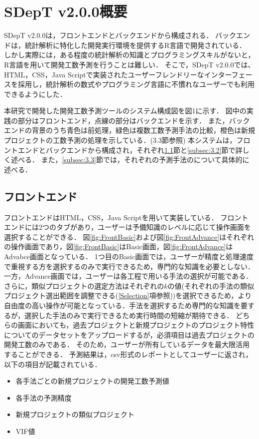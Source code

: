 \section{SDepT v2.0.0概要}\label{sec:3}

SDepT v2.0.0は，フロントエンドとバックエンドから構成される．
バックエンドは，統計解析に特化した開発実行環境を提供するR言語で開発されている．
しかし実際には，ある程度の統計解析の知識とプログラミングスキルがないと，R言語を用いて開発工数予測を行うことは難しい．
そこで，SDepT v2.0.0では、HTML，CSS，Java Scriptで実装されたユーザーフレンドリーなインターフェースを採用し，統計解析の数式やプログラミング言語に不慣れなユーザーでも利用できるようにした．

本研究で開発した開発工数予測ツールのシステム構成図を図1に示す．
図中の実践の部分はフロントエンド，点線の部分はバックエンドを示す．
また，バックエンドの背景のうち青色は前処理，緑色は複数工数予測手法の比較，橙色は新規プロジェクトの工数予測の処理を示している．(3.3節参照)
本システムは，フロントエンドとバックエンドから構成され，それぞれ\ref{subsec:3.1}節と\ref{subsec:3.2}節で詳しく述べる．
また，\ref{subsec:3.3}節では，それぞれの予測手法のについて具体的に述べる．


\clearpage
\subsection{フロントエンド}\label{subsec:3.1}
フロントエンドはHTML，CSS，Java Scriptを用いて実装している．
フロントエンドには2つのタブがあり，ユーザーは予備知識のレベルに応じて操作画面を選択することができる．
図\ref{fig:FrontBasic}および図\ref{fig:FrontAdvance}はそれぞれの操作画面であり，図\ref{fig:FrontBasic}はBasic画面，図\ref{fig:FrontAdvance}はAdvabce画面となっている．
1つ目のBasic画面では，ユーザーが精度と処理速度で重視する方を選択するのみで実行できるため，専門的な知識を必要としない．
一方，Advance画面では，ユーザーは各工程で用いる手法の選択が可能である．
さらに，類似プロジェクトの選定方法はそれぞれの$k$の値(それぞれの手法の類似プロジェクト選出範囲を調整できる(\ref{Selection}項参照))を選択できるため，より自由度の高い操作が可能となっている．手法を選択するため専門的な知識を要するが，選択した手法のみで実行できるため実行時間の短縮が期待できる．
どちらの画面においても，過去プロジェクトと新規プロジェクトのプロジェクト特性についてのデータセットをアップロードするが，必須項目は過去プロジェクトの開発工数のみである．
そのため，ユーザーが所有しているデータを最大限活用することができる．
予測結果は，csv形式のレポートとしてユーザーに返され，以下の項目が記載されている．
\begin{itemize}
  \item 各手法ごとの新規プロジェクトの開発工数予測値
  \item 各手法の予測精度
  \item 新規プロジェクトの類似プロジェクト
  \item VIF値
\end{itemize}

